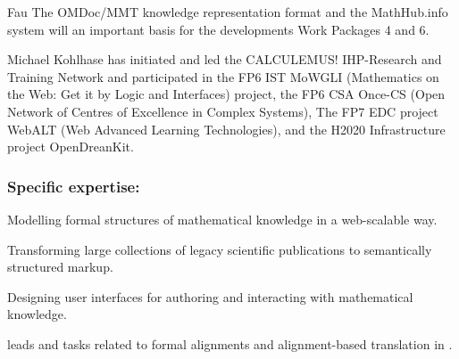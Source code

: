 \begin{sitedescription}{Fau}
The \textsf{OMDoc/MMT} knowledge representation format and the \textsf{MathHub.info}
system will an important basis for the developments Work Packages 4 and 6.

Michael Kohlhase has initiated and led the CALCULEMUS! IHP-Research and Training Network
and participated in the FP6 IST MoWGLI (Mathematics on the Web: Get it by Logic and
Interfaces) project, the FP6 CSA Once-CS (Open Network of Centres of Excellence in Complex
Systems), The FP7 EDC project WebALT (Web Advanced Learning Technologies), and the H2020
Infrastructure project OpenDreanKit.

\subsubsection*{Specific expertise:}
\begin{compactitem}
\item Modelling formal structures of mathematical knowledge in a web-scalable way.
\item Transforming large collections of legacy scientific publications to semantically
  structured markup.
\item Designing user interfaces for authoring and interacting with mathematical knowledge.
\end{compactitem}

 leads  and tasks related to formal alignments and
alignment-based translation in .

\end{sitedescription}

